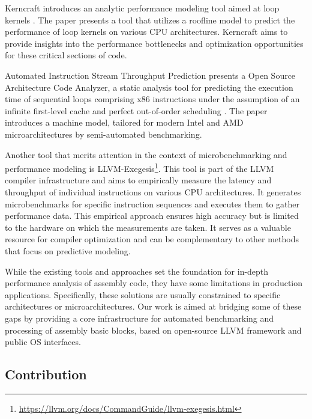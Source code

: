 Kerncraft introduces an analytic performance modeling tool aimed at loop 
kernels \cite{hammerKerncraftToolAnalytic2017}. The paper presents a tool that utilizes a roofline model 
to predict the performance of loop kernels on various CPU architectures. Kerncraft aims to provide insights
into the performance bottlenecks and optimization opportunities for these critical sections of code.

Automated Instruction Stream Throughput Prediction presents a Open Source Architecture Code Analyzer, 
a static analysis tool for predicting the execution time of sequential loops comprising x86 instructions
under the assumption of an infinite first-level cache and perfect out-of-order 
scheduling \cite{laukemannAutomatedInstructionStream2018}. The paper introduces a machine model, tailored 
for modern Intel and AMD microarchitectures by semi-automated benchmarking.

Another tool that merits attention in the context of microbenchmarking and performance modeling is 
LLVM-Exegesis\footnote{\url{https://llvm.org/docs/CommandGuide/llvm-exegesis.html}}.
This tool is part of the LLVM compiler infrastructure and aims to 
empirically measure the latency and throughput of individual instructions on various CPU architectures. 
It generates microbenchmarks for specific instruction sequences and executes them to gather performance 
data. This empirical approach ensures high accuracy but is limited to the hardware on which the measurements
are taken. It serves as a valuable resource for compiler optimization and can be complementary to other 
methods that focus on predictive modeling.

While the existing tools and approaches set the foundation for in-depth performance analysis of assembly
code, they have some limitations in production applications. Specifically, these solutions are usually
constrained to specific architectures or microarchitectures. Our work is aimed at bridging some of
these gaps by providing a core infrastructure for automated benchmarking and processing of assembly
basic blocks, based on open-source LLVM framework and public OS interfaces.

\subsection{Contribution}

